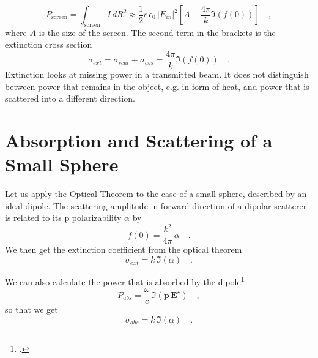 \begin{equation}
 P_\text{screen} = \int_\text{screen} I \, dR^2  \approx  \frac{1}{2} c \, \epsilon_0 \,|E_{in}|^2 \left[  A  - \frac{4 \pi }{k} \Im ( f(0) ) \right] \quad ,
\end{equation}
where $A$ is the size of the screen. The second term in the brackets is the extinction cross section
\begin{equation}
 \sigma_{ext} = \sigma_{scat}  + \sigma_{abs}  = \frac{4 \pi }{k} \Im ( f(0) ) \quad .
\end{equation}
Extinction looks at missing power in a transmitted beam. It does not distinguish between power that remains in the object, e.g. in form of heat, and power that is scattered into a different direction.


\section{Absorption and Scattering of a Small Sphere}

Let us apply the Optical Theorem to the case of a small sphere, described by an ideal dipole.
The scattering amplitude in forward direction of a dipolar scatterer is related to its p polarizability $\alpha$ by 
\begin{equation}
 f(0) = \frac{k^2}{4 \pi} \, \alpha \quad .
\end{equation}
We  then get the extinction coefficient from the optical theorem
\begin{equation}
 \sigma_{ext} = k \, \Im ( \alpha ) \quad .
\end{equation}

We can also calculate the power that is absorbed by the dipole\footcite[Chapter 8]{Novotny-Hecht2012}
\begin{equation}
 P_{abs} = \frac{\omega}{c} \, \Im \left( \mathbf{p} \, \mathbf{E}^\star \right)  \quad ,
\end{equation}
so that we get 
\begin{equation}
 \sigma_{abs} = k \, \Im ( \alpha ) \quad .
\end{equation}


